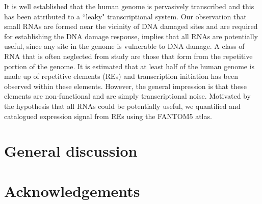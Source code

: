 \documentclass[10pt,a4paper]{report}
\begin{document}
It is well established that the human genome is pervasively transcribed and this has been attributed to a ``leaky" transcriptional system. Our observation that small RNAs are formed near the vicinity of DNA damaged sites and are required for establishing the DNA damage response, implies that all RNAs are potentially useful, since any site in the genome is vulnerable to DNA damage. A class of RNA that is often neglected from study are those that form from the repetitive portion of the genome. It is estimated that at least half of the human genome is made up of repetitive elements (REs) and transcription initiation has been observed within these elements\cite{pmid19377475}. However, the general impression is that these elements are non-functional and are simply transcriptional noise. Motivated by the hypothesis that all RNAs could be potentially useful, we quantified and catalogued expression signal from REs using the FANTOM5 atlas.



%

\chapter{General discussion}\label{discussion}


\chapter*{Acknowledgements}



%

\end{document}

